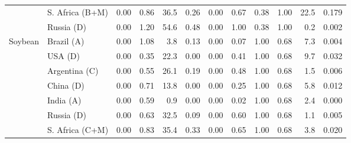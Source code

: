 \begin{tabular}{llrrrrrrrrrr}
 & S. Africa (B+M) & 0.00 & 0.86 & 36.5 & 0.26 & 0.00 & 0.67 & 0.38 & 1.00 & 22.5 & 0.179 \\
 & Russia (D) & 0.00 & 1.20 & 54.6 & 0.48 & 0.00 & 1.00 & 0.38 & 1.00 & 0.2 & 0.002 \\
\midrule
Soybean & Brazil (A) & 0.00 & 1.08 & 3.8 & 0.13 & 0.00 & 0.07 & 1.00 & 0.68 & 7.3 & 0.004 \\
 & USA (D) & 0.00 & 0.35 & 22.3 & 0.00 & 0.00 & 0.41 & 1.00 & 0.68 & 9.7 & 0.032 \\
 & Argentina (C) & 0.00 & 0.55 & 26.1 & 0.19 & 0.00 & 0.48 & 1.00 & 0.68 & 1.5 & 0.006 \\
 & China (D) & 0.00 & 0.71 & 13.8 & 0.00 & 0.00 & 0.25 & 1.00 & 0.68 & 5.8 & 0.012 \\
 & India (A) & 0.00 & 0.59 & 0.9 & 0.00 & 0.00 & 0.02 & 1.00 & 0.68 & 2.4 & 0.000 \\
 & Russia (D) & 0.00 & 0.63 & 32.5 & 0.09 & 0.00 & 0.60 & 1.00 & 0.68 & 1.1 & 0.005 \\
 & S. Africa (C+M) & 0.00 & 0.83 & 35.4 & 0.33 & 0.00 & 0.65 & 1.00 & 0.68 & 3.8 & 0.020 \\
\bottomrule
\end{tabular}
